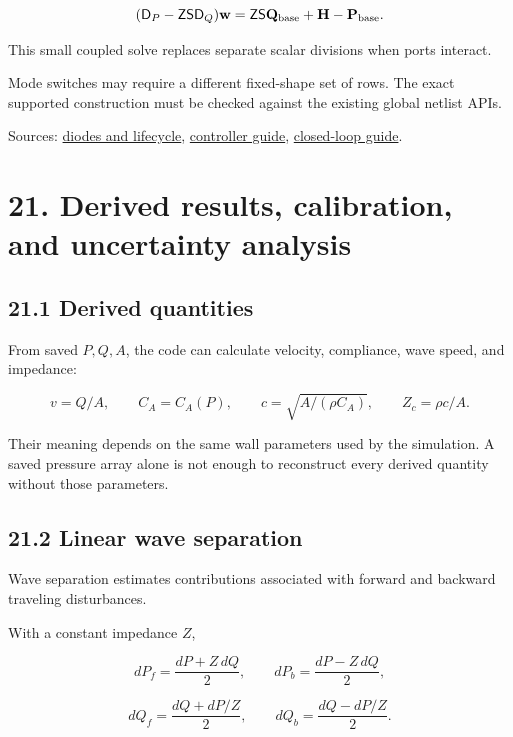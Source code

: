 \documentclass[11pt,a4paper]{article}
\begin{document}
\begingroup\small
\[
(\mathsf D_P-\mathsf Z\mathsf S\mathsf D_Q)\mathbf w
=
\mathsf Z\mathsf S\mathbf Q_{\rm base}
+\mathbf H-\mathbf P_{\rm base}.
\]
\endgroup


This small coupled solve replaces separate scalar divisions when ports interact.

Mode switches may require a different fixed-shape set of rows. The exact supported construction must be checked against the existing global netlist APIs.

Sources: \href{/home/sadid/crimson/cfs_reg/CRIMSONFlowsolver/flowsolver/netlist_py/docs/NETLIST_SOLVER_DEVELOPER_GUIDE.md}{diodes and lifecycle}, \href{/home/sadid/crimson/cfs_reg/CRIMSONFlowsolver/flowsolver/netlist_py/docs/CONTROLLER_ARCHITECTURE_TEACHING_GUIDE.md}{controller guide}, \href{/home/sadid/crimson/cfs_reg/CRIMSONFlowsolver/flowsolver/netlist_py/docs/closed_loop_lifecycle.md}{closed-loop guide}.

\clearpage
\section{21. Derived results, calibration, and uncertainty analysis}
\subsection{21.1 Derived quantities}
From saved \(P,Q,A\), the code can calculate velocity, compliance, wave speed, and impedance:


\begingroup\small
\[
v=Q/A,\qquad
C_A=C_A(P),\qquad
c=\sqrt{A/(\rho C_A)},\qquad
Z_c=\rho c/A.
\]
\endgroup


Their meaning depends on the same wall parameters used by the simulation. A saved pressure array alone is not enough to reconstruct every derived quantity without those parameters.

\subsection{21.2 Linear wave separation}
Wave separation estimates contributions associated with forward and backward traveling disturbances.

With a constant impedance \(Z\),


\begingroup\small
\[
dP_f=\frac{dP+Z\,dQ}{2},
\qquad
dP_b=\frac{dP-Z\,dQ}{2},
\]
\endgroup



\begingroup\small
\[
dQ_f=\frac{dQ+dP/Z}{2},
\qquad
dQ_b=\frac{dQ-dP/Z}{2}.
\]
\endgroup
\end{document}
